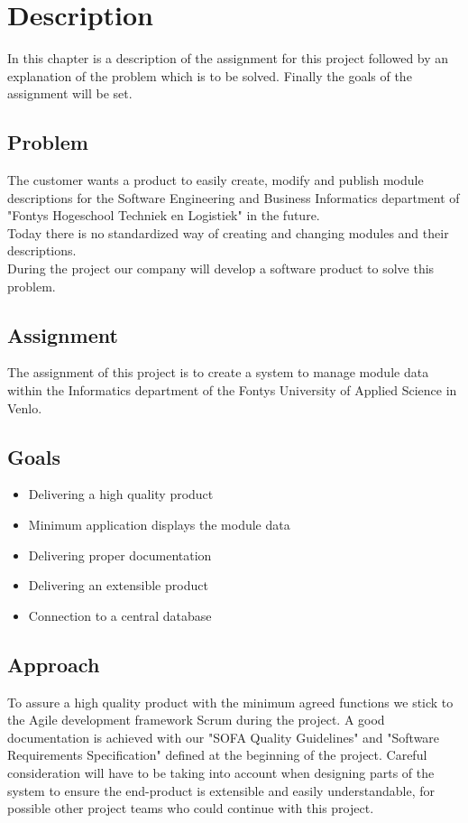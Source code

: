 \chapter{Description}
In this chapter is a description of the assignment for this project followed by an explanation 
of the problem which is to be solved. Finally the goals of the assignment will be set.

\section{Problem}
The customer wants a product to easily create, modify and publish module descriptions
for the Software Engineering and Business Informatics department of "Fontys Hogeschool Techniek en Logistiek" in the future.
\newline \\
Today there is no standardized way of creating and changing modules and their descriptions.
\newline \\
During the project our company will develop a software product to solve this problem.

\section{Assignment}
The assignment of this project is to create a system to manage module data within the Informatics
department of the Fontys University of Applied Science in Venlo. 

\newpage

\section{Goals}
\begin{itemize}
    \item Delivering a high quality product
    \item Minimum application displays the module data 
    \item Delivering proper documentation
    \item Delivering an extensible product
    \item Connection to a central database
\end{itemize}

\section{Approach}
To assure a high quality product with the minimum agreed functions we stick to the Agile development framework Scrum during the project.
A good documentation is achieved with our "SOFA Quality Guidelines" and "Software Requirements Specification" defined at the beginning of the project.
Careful consideration will have to be taking into account when designing parts of the system to ensure the end-product is extensible and easily understandable, for possible other project teams who could continue with this project.


